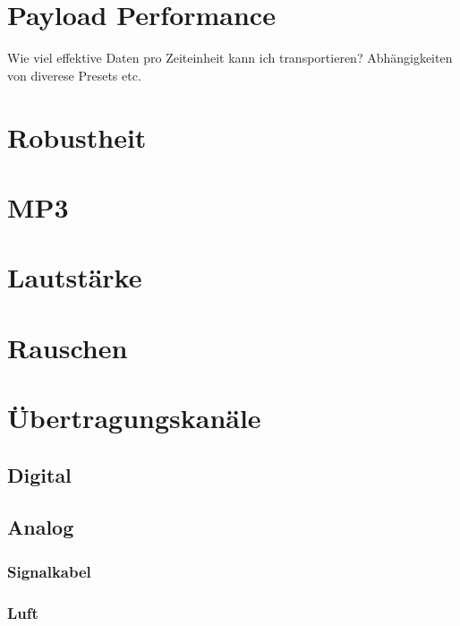 
\section{Payload Performance}

Wie viel effektive Daten pro Zeiteinheit kann ich transportieren? Abhängigkeiten von diverese Presets etc.

\section{Robustheit}

\section{MP3}

\section{Lautstärke}

\section{Rauschen}

\section{Übertragungskanäle}

\subsection{Digital}

\subsection{Analog}

\subsubsection{Signalkabel}

\subsubsection{Luft}






